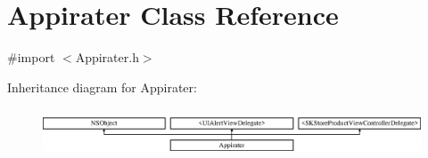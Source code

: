 \hypertarget{interface_appirater}{\section{Appirater Class Reference}
\label{interface_appirater}
}


{\ttfamily \#import $<$Appirater.\-h$>$}

Inheritance diagram for Appirater\-:\begin{figure}[H]
\begin{center}
\leavevmode
\includegraphics[height=1.447028cm]{interface_appirater}
\end{center}
\end{figure}
